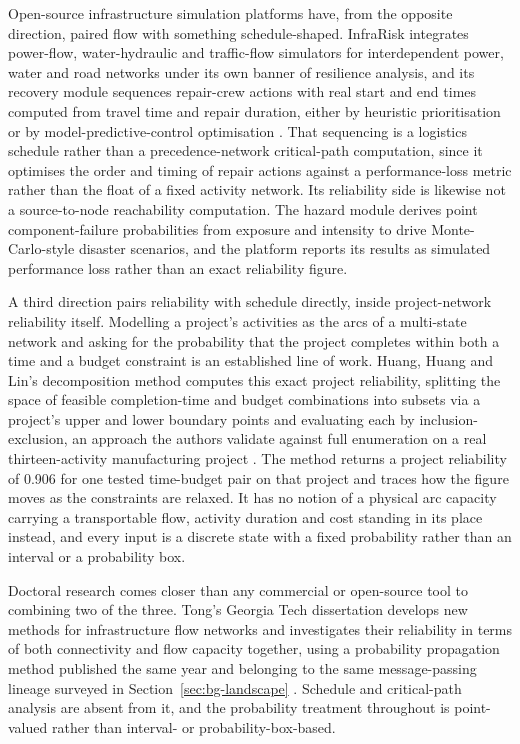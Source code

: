 \documentclass[12pt]{report}
\begin{document}
Open-source infrastructure simulation platforms have, from the opposite direction, paired flow
with something schedule-shaped. InfraRisk integrates power-flow, water-hydraulic and
traffic-flow simulators for interdependent power, water and road networks under its own banner
of resilience analysis, and its recovery module sequences repair-crew actions with real start
and end times computed from travel time and repair duration, either by heuristic prioritisation
or by model-predictive-control optimisation \cite{balakrishnan2022infrarisk}. That sequencing is
a logistics schedule rather than a precedence-network critical-path computation, since it
optimises the order and timing of repair actions against a performance-loss metric rather than
the float of a fixed activity network. Its reliability side is likewise not a source-to-node
reachability computation. The hazard module derives point component-failure probabilities from
exposure and intensity to drive Monte-Carlo-style disaster scenarios, and the platform reports
its results as simulated performance loss rather than an exact reliability figure.

A third direction pairs reliability with schedule directly, inside project-network reliability
itself. Modelling a project's activities as the arcs of a multi-state network and asking for the
probability that the project completes within both a time and a budget constraint is an
established line of work. Huang, Huang and Lin's decomposition method computes this exact
project reliability, splitting the space of feasible completion-time and budget combinations
into subsets via a project's upper and lower boundary points and evaluating each by
inclusion-exclusion, an approach the authors validate against full enumeration on a real
thirteen-activity manufacturing project \cite{huang2020exact}. The method returns a project
reliability of 0.906 for one tested time-budget pair on that project and traces how the figure
moves as the constraints are relaxed. It has no notion of a physical arc capacity carrying a
transportable flow, activity duration and cost standing in its place instead, and every input is
a discrete state with a fixed probability rather than an interval or a probability box.

Doctoral research comes closer than any commercial or open-source tool to combining two of the
three. Tong's Georgia Tech dissertation develops new methods for infrastructure flow networks
and investigates their reliability in terms of both connectivity and flow capacity together,
using a probability propagation method published the same year and belonging to the same
message-passing lineage surveyed in Section~\ref{sec:bg-landscape} \cite{tong2021infrastructure}.
Schedule and critical-path analysis are absent from it, and the probability treatment throughout
is point-valued rather than interval- or probability-box-based.
\end{document}
